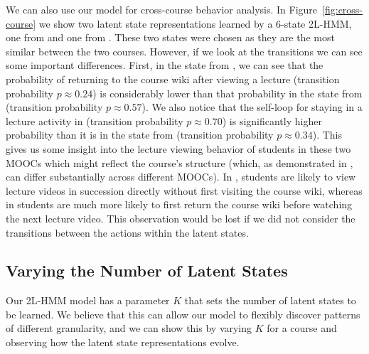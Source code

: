 We can also use our model for cross-course behavior analysis. In
Figure~\ref{fig:cross-course} we show two latent state representations
learned by a 6-state 2L-HMM, one from \textretrieval{} and one from
\sustain{}. These two states were chosen as they are the most similar
between the two courses. However, if we look at the transitions we can see
some important differences. First, in the state from \textretrieval{}, we
can see that the probability of returning to the course wiki after viewing
a lecture (transition probability $p \approx 0.24$) is considerably lower
than that probability in the state from \sustain{} (transition probability
$p \approx 0.57$). We also notice that the self-loop for staying in a
lecture activity in \textretrieval{} (transition probability $p \approx
0.70$) is significantly higher probability than it is in the state from
\sustain{} (transition probability $p \approx 0.34$).  This gives us some
insight into the lecture viewing behavior of students in these two MOOCs
which might reflect the course's structure (which, as demonstrated in
\citet{Davis:2016:EDM}, can differ substantially across different MOOCs).
In \textretrieval{}, students are likely to view lecture videos in
succession directly without first visiting the course wiki, whereas in
\sustain{} students are much more likely to first return the course wiki
before watching the next lecture video. This observation would be lost if
we did not consider the transitions between the actions within the latent
states.

\subsection{Varying the Number of Latent States}
Our 2L-HMM model has a parameter $K$ that sets the number of latent states
to be learned. We believe that this can allow our model to flexibly
discover patterns of different granularity, and we can show this by varying
$K$ for a course and observing how the latent state representations evolve.

